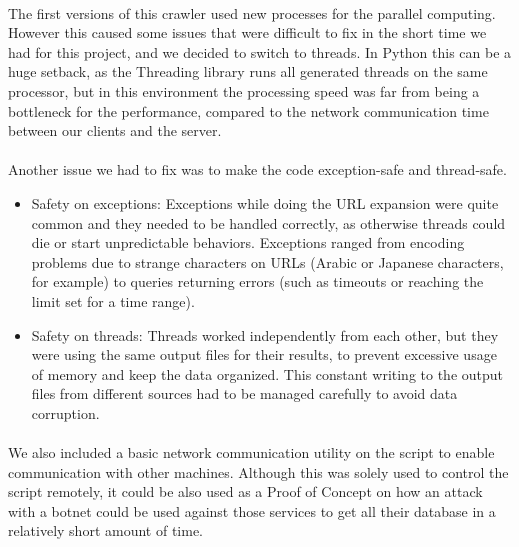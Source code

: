 \documentclass[12pt]{article}
\begin{document}
\paragraph{}
The first versions of this crawler used new processes for the parallel computing. However this caused some issues that were difficult to fix in the short time we had for this project, and we decided to switch to threads. In Python this can be a huge setback, as the Threading library runs all generated threads on the same processor, but in this environment the processing speed was far from being a bottleneck for the performance, compared to the network communication time between our clients and the server.

\paragraph{}
Another issue we had to fix was to make the code exception-safe and thread-safe.

\begin{itemize}

\item  Safety on exceptions: Exceptions while doing the URL expansion were quite common and they needed to be handled correctly, as otherwise threads could die or start unpredictable behaviors. Exceptions ranged from encoding problems due to strange characters on URLs (Arabic or Japanese characters, for example) to queries returning errors (such as timeouts or reaching the limit set for a time range).

\item  Safety on threads: Threads worked independently from each other, but they were using the same output files for their results, to prevent excessive usage of memory and keep the data organized. This constant writing to the output files from different sources had to be managed carefully to avoid data corruption.

\end{itemize}

\paragraph{}
We also included a basic network communication utility on the script to enable communication with other machines. Although this was solely used to control the script remotely, it could be also used as a Proof of Concept on how an attack with a botnet could be used against those services to get all their database in a relatively short amount of time.
\end{document}
